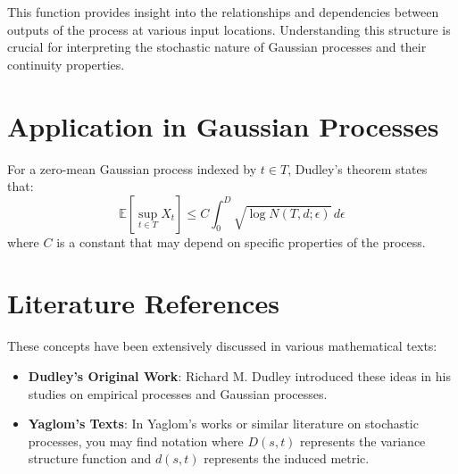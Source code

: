 \documentclass{article}
\begin{document}
This function provides insight into the relationships and dependencies between outputs of the process at various input locations. Understanding this structure is crucial for interpreting the stochastic nature of Gaussian processes and their continuity properties.

\section{Application in Gaussian Processes}
For a zero-mean Gaussian process indexed by $t \in T$, Dudley’s theorem states that:
\begin{equation}
\mathbb{E}\left[\sup_{t \in T} X_t\right] \leq C \int_0^{D} \sqrt{\log N(T, d; \epsilon)}\,d\epsilon
\end{equation}
where $C$ is a constant that may depend on specific properties of the process.

\section{Literature References}
These concepts have been extensively discussed in various mathematical texts:
\begin{itemize}
  \item \textbf{Dudley’s Original Work}: Richard M. Dudley introduced these ideas in his studies on empirical processes and Gaussian processes.
  \item \textbf{Yaglom's Texts}: In Yaglom's works or similar literature on stochastic processes, you may find notation where $D(s,t)$ represents the variance structure function and $d(s,t)$ represents the induced metric.
\end{itemize}
\end{document}
